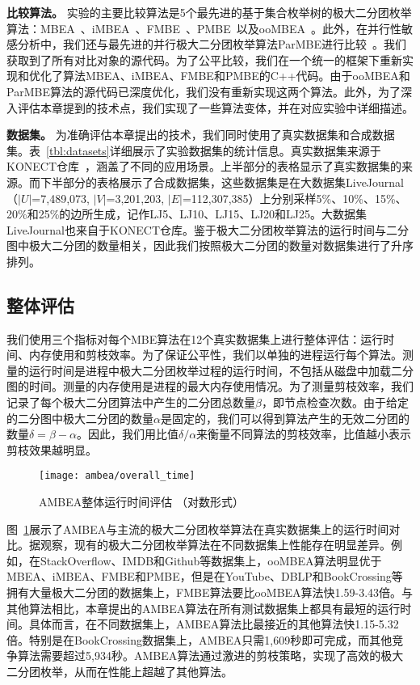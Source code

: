 \textbf{比较算法。} 实验的主要比较算法是5个最先进的基于集合枚举树的极大二分团枚举算法：MBEA~\cite{iMBEA14}、iMBEA~\cite{iMBEA14}、FMBE~\cite{parMBE18}、PMBE~\cite{PMBE20}以及ooMBEA~\cite{ooMBE22}。此外，在并行性敏感分析中，我们还与最先进的并行极大二分团枚举算法ParMBE进行比较~\cite{parMBE18}。我们获取到了所有对比对象的源代码。为了公平比较，我们在一个统一的框架下重新实现和优化了算法MBEA、iMBEA、FMBE和PMBE的C++代码。由于ooMBEA和ParMBE算法的源代码已深度优化，我们没有重新实现这两个算法。此外，为了深入评估本章提到的技术点，我们实现了一些算法变体，并在对应实验中详细描述。

 

\textbf{数据集。} 为准确评估本章提出的技术，我们同时使用了真实数据集和合成数据集。表~\ref{tbl:datasets}详细展示了实验数据集的统计信息。真实数据集来源于KONECT仓库~\cite{konect}，涵盖了不同的应用场景。上半部分的表格显示了真实数据集的来源。而下半部分的表格展示了合成数据集，这些数据集是在大数据集LiveJournal （$|U|$=7,489,073, $|V|$=3,201,203, $|E|$=112,307,385）上分别采样5\%、10\%、15\%、20\%和25\%的边所生成，记作LJ5、LJ10、LJ15、LJ20和LJ25。大数据集LiveJournal也来自于KONECT仓库。鉴于极大二分团枚举算法的运行时间与二分图中极大二分团的数量相关，因此我们按照极大二分团的数量对数据集进行了升序排列。

\subsection{整体评估}
\label{subsec:ambea_exp_overall}

我们使用三个指标对每个MBE算法在12个真实数据集上进行整体评估：运行时间、内存使用和剪枝效率。为了保证公平性，我们以单独的进程运行每个算法。测量的运行时间是进程中极大二分团枚举过程的运行时间，不包括从磁盘中加载二分图的时间。测量的内存使用是进程的最大内存使用情况。为了测量剪枝效率，我们记录了每个极大二分团算法中产生的二分团总数量$\beta$，即节点检查次数。由于给定的二分图中极大二分团的数量$\alpha$是固定的，我们可以得到算法产生的无效二分团的数量$\delta=\beta-\alpha$。因此，我们用比值$\delta/\alpha$来衡量不同算法的剪枝效率，比值越小表示剪枝效果越明显。

\begin{figure} [H]
  \centering
  \texttt{[image: ambea/overall\_time]}
  \caption{AMBEA整体运行时间评估 （对数形式）}
  \label{fig:ambea_overall_time}
\end{figure}

图~\ref{fig:ambea_overall_time}展示了AMBEA与主流的极大二分团枚举算法在真实数据集上的运行时间对比。据观察，现有的极大二分团枚举算法在不同数据集上性能存在明显差异。例如，在StackOverflow、IMDB和Github等数据集上，ooMBEA算法明显优于MBEA、iMBEA、FMBE和PMBE，但是在YouTube、DBLP和BookCrossing等拥有大量极大二分团的数据集上，FMBE算法要比ooMBEA算法快1.59-3.43倍。与其他算法相比，本章提出的AMBEA算法在所有测试数据集上都具有最短的运行时间。具体而言，在不同数据集上，AMBEA算法比最接近的其他算法快1.15-5.32倍。特别是在BookCrossing数据集上，AMBEA只需1,609秒即可完成，而其他竞争算法需要超过5,934秒。AMBEA算法通过激进的剪枝策略，实现了高效的极大二分团枚举，从而在性能上超越了其他算法。

